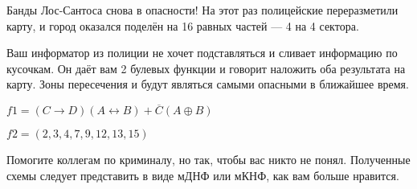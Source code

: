 \question
Банды Лос-Сантоса снова в опасности! На этот раз полицейские переразметили карту, и город оказался поделён на 16 равных частей — 4 на 4 сектора.

Ваш информатор из полиции не хочет подставляться и сливает информацию по кусочкам. Он даёт вам 2 булевых функции и говорит наложить оба результата на карту. Зоны пересечения и будут являться самыми опасными в ближайшее время.

\begin{center}
$f1=(C\rightarrow D)(A \leftrightarrow B) + \overline{C}(A \oplus B)$

$f2=(2,3,4,7,9,12,13,15)$
\end{center}

Помогите коллегам по криминалу, но так, чтобы вас никто не понял. Полученные схемы следует представить в виде мДНФ или мКНФ, как вам больше нравится.